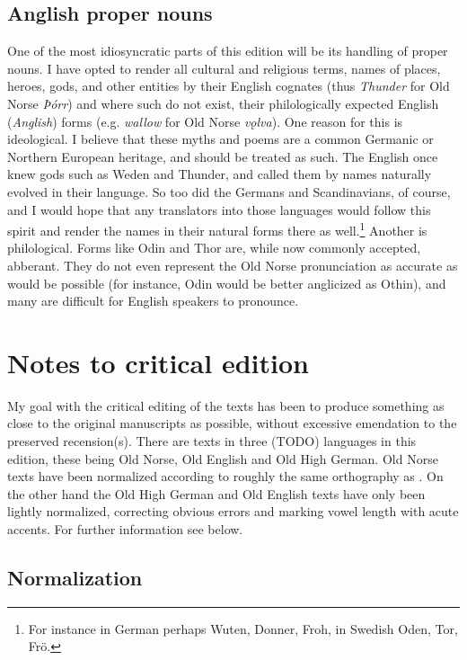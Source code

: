   \subsection{Anglish proper nouns}
    One of the most idiosyncratic parts of this edition will be its handling of proper nouns. I have opted to render all cultural and religious terms, names of places, heroes, gods, and other entities by their English cognates (thus \emph{Thunder} for Old Norse \emph{Þórr}) and where such do not exist, their philologically expected English (\emph{Anglish}) forms (e.g. \emph{wallow} for Old Norse \emph{vǫlva}).
    One reason for this is ideological. I believe that these myths and poems are a common Germanic or Northern European heritage, and should be treated as such. The English once knew gods such as Weden and Thunder, and called them by names naturally evolved in their language. So too did the Germans and Scandinavians, of course, and I would hope that any translators into those languages would follow this spirit and render the names in their natural forms there as well.\footnote{For instance in German perhaps Wuten, Donner, Froh, in Swedish Oden, Tor, Frö.}
    Another is philological. Forms like Odin and Thor are, while now commonly accepted, abberant. They do not even represent the Old Norse pronunciation as accurate as would be possible (for instance, Odin would be better anglicized as Othin), and many are difficult for English speakers to pronounce.

\section{Notes to critical edition}
  My goal with the critical editing of the texts has been to produce something as close to the original manuscripts as possible, without excessive emendation to the preserved recension(s). There are texts in three (TODO) languages in this edition, these being Old Norse, Old English and Old High German. Old Norse texts have been normalized according to roughly the same orthography as \textcite{FinnurEdda}. On the other hand the Old High German and Old English texts have only been lightly normalized, correcting obvious errors and marking vowel length with acute accents. For further information see below.

  \subsection{Normalization}
